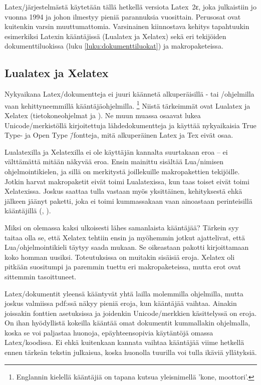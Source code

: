 Latex\-/järjestelmästä käytetään tällä hetkellä versiota Latex~2ε, joka
julkaistiin jo vuonna 1994 ja johon ilmestyy pieniä parannuksia
vuosittain. Perusosat ovat kuitenkin varsin muuttumattomia. Varsinainen
kiinnostava kehitys tapahtuukin esimerkiksi Latexin kääntäjissä
(Lualatex ja Xelatex) sekä eri tekijöiden dokumenttiluokissa (luku
\ref{luku:dokumenttiluokat}) ja makropaketeissa.

\subsection{Lualatex ja Xelatex}

Nyky\-aikana Latex\-/dokumentteja ei juuri käännetä alkuperäisillä
- tai \-/ohjelmilla vaan kehittyneemmillä
kään\-täjä\-ohjel\-milla.%
\footnote{Englannin kielellä kääntäjiä on tapana kutsua yleisnimellä
  \emph{} 'kone, moottori'.} Niistä tärkeimmät ovat
Lualatex ja Xelatex (tietokoneohjelmat  ja
). Ne muun muassa osaavat lukea Unicode\-/merkistöllä
kirjoitettuja lähdedokumentteja ja käyttää nyky\-aikaisia True Type- ja
Open Type \=/fontteja, mitä alkuperäinen Latex ja Tex eivät osaa.

Lualatexilla ja Xelatexilla ei ole käyttäjän kannalta suurtakaan eroa --
ei välttämättä mitään näkyvää eroa. Ensin mainittu sisältää
Lua\-/nimisen ohjelmointikielen, ja sillä on merkitystä joillekuille
makropakettien tekijöille. Jotkin harvat makropaketit eivät toimi
Lualatexissa, kun taas toiset eivät toimi Xelatexissa. Joskus saattaa
tulla vastaan myös yksittäinen, kehityksestä ehkä jälkeen jäänyt
paketti, joka ei toimi kummassakaan vaan ainoastaan perinteisillä
kääntäjillä (, ).

Miksi on olemassa kaksi ulkoisesti lähes samanlaista kääntäjää? Tärkein
syy taitaa olla se, että Xelatex tehtiin ensin ja myöhemmin jotkut
ajattelivat, että Lua\-/ohjelmointikieli täytyy saada mukaan. Se
oikeastaan pakotti kirjoittamaan koko homman uusiksi. Toteutuksissa on
muitakin sisäisiä eroja. Xelatex oli pitkään suositumpi ja paremmin
tuettu eri makropaketeissa, mutta erot ovat sittemmin tasoittuneet.

Latex\-/dokumentit yleensä kääntyvät yhtä lailla molemmilla ohjelmilla,
mutta joskus valmiissa pdf:ssä näkyy pieniä eroja, kun kääntäjää
vaihtaa. Ainakin joissakin fonttien asetuksissa ja joidenkin
Unicode\-/merkkien käsittelyssä on eroja. On ihan hyödyllistä kokeilla
kääntää omat dokumentit kummallakin ohjelmalla, koska se voi paljastaa
huonoja, epäyhteensopivia käytäntöjä omassa Latex\-/koodissa. Ei ehkä
kuitenkaan kannata vaihtaa kääntäjää viime hetkellä ennen tärkeän
tekstin julkaisua, koska huonolla tuurilla voi tulla ikäviä yllätyksiä.

